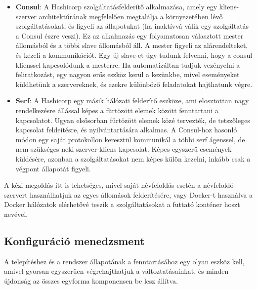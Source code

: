 \documentclass[11pt,magyar,a4paper,twoside,]{report}
\begin{document}
\begin{itemize}
\item
  \textbf{Consul}\citep{consul}: A Hashicorp szolgáltatásfelderítő
  alkalmazása, amely egy kliens-szerver architektúrának megfelelően
  megtalálja a környezetében lévő szolgáltatásokat, és figyeli az
  állapotukat (ha inaktívvá válik egy szolgáltatás a Consul észre
  veszi). Ez az alkalmazás egy folyamatosan választott mester állomásból
  és a többi slave állomásból áll. A mester figyeli az alárendelteket,
  és kezeli a kommunikációt. Egy új slave-et úgy tudunk felvenni, hogy a
  consul klienssel kapcsolódunk a mesterre. Ha automatizáltan tudjuk
  vezényelni a feliratkozást, egy nagyon erős eszköz kerül a kezünkbe,
  mivel eseményeket küldhetünk a szervereknek, és ezekre különböző
  feladatokat hajthatunk végre.
\item
  \textbf{Serf}\citep{serf}: A Hashicorp egy másik hálózati felderítő
  eszköze, ami elosztottan nagy rendelkezésre állással képes a fürtözött
  elemek között fenntartani a kapcsolatot. Ugyan elsősorban fürtözött
  elemek közé tervezték, de tetszőleges kapcsolat feldeítésre, és
  nyilvántartására alkalmas. A Consul-hoz hasonló módon egy saját
  protokollon keresztül kommunikál a többi serf ágenssel, de nem
  szükséges neki szerver-kliens kapcsolat. Képes egyszerű események
  küldésére, azonban a szolgáltatásokat nem képes külön kezelni, inkább
  csak a végpont állapotát figyeli.
\end{itemize}

A kézi megoldás itt is lehetséges, mivel saját névfeloldás esetén a
névfeloldó szervert használhatjuk az egyes állomások felderítésére, vagy
Docker-t használva a Docker hálózatok elérhetővé teszik a
szolgáltatásokat a futtató konténer hoszt nevével.

\subsection{Konfiguráció
menedzsment}\label{konfiguruxe1ciuxf3-menedzsment}

A telepítéshez és a rendszer állapotának a fenntartásához egy olyan
eszköz kell, amivel gyorsan egyszerűen végrehajthatjuk a
változtatásainkat, és minden újdonság az összes egyforma komponensen be
lesz állítva.
\end{document}
